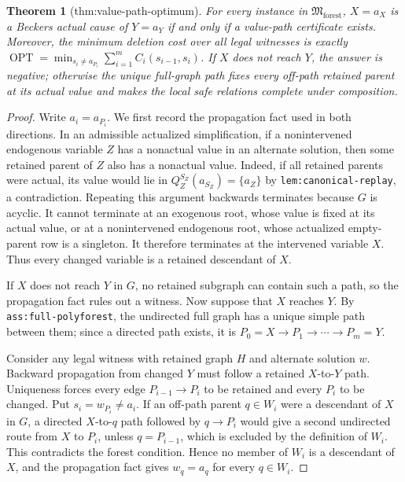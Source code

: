 \documentclass{article}
\newtheorem{theorem}{Theorem}
\begin{document}
\begin{theorem}[thm:value-path-optimum]\label{thm:value-path-optimum}
For every instance in \(\mathfrak M_{\mathrm{forest}}\), \(X=a_X\) is a Beckers actual cause of \(Y=a_Y\) if and only if a value-path certificate exists. Moreover, the minimum deletion cost over all legal witnesses is exactly \(\operatorname{OPT}=\min_{s_i\ne a_{P_i}}\sum_{i=1}^{m}C_i(s_{i-1},s_i)\). If \(X\) does not reach \(Y\), the answer is negative; otherwise the unique full-graph path fixes every off-path retained parent at its actual value and makes the local safe relations complete under composition.
\end{theorem}
\begin{proof}
Write \(a_i=a_{P_i}\).  We first record the propagation fact used in both directions.  In an admissible actualized simplification, if a nonintervened endogenous variable \(Z\) has a nonactual value in an alternate solution, then some retained parent of \(Z\) also has a nonactual value.  Indeed, if all retained parents were actual, its value would lie in \(Q_Z^{S_Z}(a_{S_Z})=\{a_Z\}\) by \texttt{lem:canonical-replay}, a contradiction.  Repeating this argument backwards terminates because \(G\) is acyclic.  It cannot terminate at an exogenous root, whose value is fixed at its actual value, or at a nonintervened endogenous root, whose actualized empty-parent row is a singleton.  It therefore terminates at the intervened variable \(X\).  Thus every changed variable is a retained descendant of \(X\).

If \(X\) does not reach \(Y\) in \(G\), no retained subgraph can contain such a path, so the propagation fact rules out a witness.  Now suppose that \(X\) reaches \(Y\).  By \texttt{ass:full-polyforest}, the undirected full graph has a unique simple path between them; since a directed path exists, it is \(P_0=X\to P_1\to\cdots\to P_m=Y\).

Consider any legal witness with retained graph \(H\) and alternate solution \(w\).  Backward propagation from changed \(Y\) must follow a retained \(X\)-to-\(Y\) path.  Uniqueness forces every edge \(P_{i-1}\to P_i\) to be retained and every \(P_i\) to be changed.  Put \(s_i=w_{P_i}\ne a_i\).  If an off-path parent \(q\in W_i\) were a descendant of \(X\) in \(G\), a directed \(X\)-to-\(q\) path followed by \(q\to P_i\) would give a second undirected route from \(X\) to \(P_i\), unless \(q=P_{i-1}\), which is excluded by the definition of \(W_i\).  This contradicts the forest condition.  Hence no member of \(W_i\) is a descendant of \(X\), and the propagation fact gives \(w_q=a_q\) for every \(q\in W_i\).


\end{proof}
\end{document}
